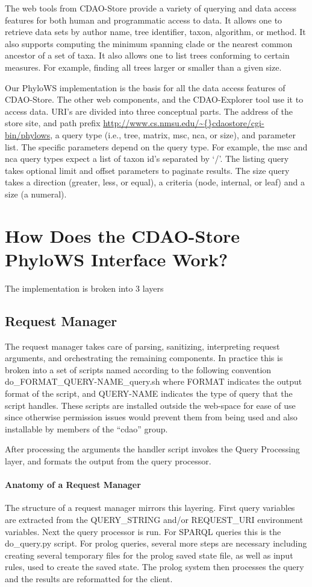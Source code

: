 \documentclass[10pt]{article}
\begin{document}
The web tools from CDAO-Store provide a variety of querying and data access
features for both human and programmatic access to data. It allows one to
retrieve data sets by author name, tree identifier, taxon, algorithm, or
method. It also supports computing the minimum spanning clade or the nearest
common ancestor of a set of taxa. It also allows one to list trees conforming
to certain measures. For example, finding all trees larger or smaller than a
given size. 

Our PhyloWS implementation is the basis for all the data access features of
CDAO-Store. The other web components, and the CDAO-Explorer tool use it to
access data. URI's are divided into three conceptual parts. The address of the
store site, and path prefix \url{http://www.cs.nmsu.edu/\~{}cdaostore/cgi-bin/phylows}, a
query type (i.e., tree, matrix, msc, nca, or size), and parameter list. The
specific parameters depend on the query type. For example, the msc and nca
query types expect a list of taxon id's separated by `/'. The listing query
takes optional limit and offset parameters to paginate results. The size query
takes a direction (greater, less, or equal), a criteria (node, internal, or
leaf) and a size (a numeral).

\section{How Does the CDAO-Store PhyloWS Interface Work?}
The implementation is broken into 3 layers
  \subsection{Request Manager}
    The request manager takes care of parsing, sanitizing, interpreting request
arguments, and orchestrating  the remaining components.  In practice this is
broken into a set of scripts named according to the following convention
do\_FORMAT\_QUERY-NAME\_query.sh where FORMAT indicates the output format of
the script, and QUERY-NAME indicates the type of query that the script handles.
These scripts are installed outside the web-space for ease of use since
otherwise permission issues would prevent them from being used and also
installable by members of the ``cdao'' group.

     After processing the arguments the handler script invokes the Query
Processing layer, and formats the output from the query processor.

     \paragraph{Anatomy of a Request Manager}
      The structure of a request manager mirrors this layering. First query
variables are extracted from the QUERY\_STRING and/or REQUEST\_URI environment
variables.  Next the query processor is run. For SPARQL queries this is the
do\_query.py script. For prolog queries, several more steps are necessary
including creating several temporary files for the prolog saved state file, as
well as input rules, used to create the saved state. The prolog system then
processes the query and the results are reformatted for the client.
\end{document}
